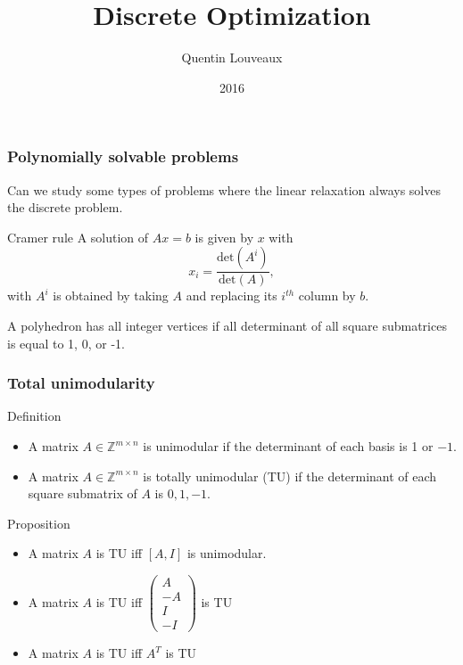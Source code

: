 \documentclass[10pt,handout]{beamer}
\title{Discrete Optimization}
\author{Quentin
Louveaux}
\institute{ULg - Institut Montefiore}
\date{2016}
\newcommand{\Z}{\mathbb Z}
\begin{document}
\begin{frame}
  \titlepage
\end{frame}

\begin{frame}
\frametitle{Polynomially solvable problems}
Can we study some types of problems where the linear relaxation \alert{always 
solves} the \alert{discrete} problem.
\begin{block}{Cramer rule}
A solution of $Ax=b$ is given by $x$ with
$$x_i = \frac{\text{det}(A^i)}{\text{det}(A)},$$
with $A^i$ is obtained by taking $A$ and replacing its $i^{th}$ column by $b$.
\end{block}
A polyhedron has all integer vertices if all determinant of all square submatrices
is equal to 1, 0, or -1.
\end{frame}
\begin{frame}
\frametitle{Total unimodularity}
\begin{block}{Definition}
\begin{itemize}
\item<1-> A matrix $A\in \Z^{m\times n}$ is \alert{unimodular} if the determinant
of \alert{each basis} is \alert{1} or \alert{$-1$}.
\item<1-> A matrix $A\in \Z^{m\times n}$ is \alert{totally unimodular} (TU) if the
determinant of each square submatrix of $A$ is \alert{$0,1,-1$}.
\end{itemize}
\end{block}
\begin{block}{Proposition}
\begin{itemize}
\item<2-> A matrix $A$ is TU iff $[A,I]$ is unimodular.
\item<2-> A matrix $A$ is TU iff $\left( \begin{array}{c}A\\-A\\I\\-I\end{array}\right)$ is TU
\item<2-> A matrix $A$ is TU iff $A^T$ is TU
\end{itemize}
\end{block}
\end{frame}
\end{document}
